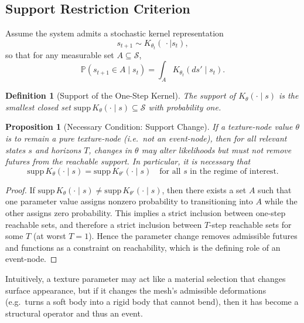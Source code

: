 \documentclass[11pt]{article}
\newtheorem{definition}{Definition}
\newtheorem{proposition}{Proposition}
\newcommand{\State}{\mathcal{S}}
\begin{document}
\subsection{Support Restriction Criterion}

Assume the system admits a stochastic kernel representation
\begin{equation}
s_{t+1} \sim K_{\theta_t}(\,\cdot \mid s_t),
\end{equation}
so that for any measurable set $A \subseteq \State$,
\begin{equation}
\mathbb{P}(s_{t+1} \in A \mid s_t) = \int_A K_{\theta_t}(ds' \mid s_t).
\end{equation}

\begin{definition}[Support of the One-Step Kernel]
The \emph{support} of $K_{\theta}(\cdot \mid s)$ is the smallest closed set
$\mathrm{supp}\,K_{\theta}(\cdot \mid s) \subseteq \State$ with
probability one.
\end{definition}

\begin{proposition}[Necessary Condition: Support Change]
If a texture-node value $\theta$ is to remain a pure texture-node (i.e.\ not an
event-node), then for all relevant states $s$ and horizons $T$,
changes in $\theta$ may alter likelihoods but must not remove futures from the
reachable support. In particular, it is necessary that
\begin{equation}
\mathrm{supp}\,K_{\theta}(\cdot \mid s) = \mathrm{supp}\,K_{\theta'}(\cdot \mid s)
\quad \text{for all } s \text{ in the regime of interest.}
\end{equation}
\end{proposition}

\begin{proof}
If $\mathrm{supp}\,K_{\theta}(\cdot \mid s) \neq \mathrm{supp}\,K_{\theta'}(\cdot \mid s)$,
then there exists a set $A$ such that one parameter value assigns nonzero
probability to transitioning into $A$ while the other assigns zero probability.
This implies a strict inclusion between one-step reachable sets, and therefore
a strict inclusion between $T$-step reachable sets for some $T$ (at worst $T=1$).
Hence the parameter change removes admissible futures and functions as a
constraint on reachability, which is the defining role of an event-node.
\end{proof}

Intuitively, a texture parameter may act like a material selection that changes
surface appearance, but if it changes the mesh's admissible deformations (e.g.\
turns a soft body into a rigid body that cannot bend), then it has become a
structural operator and thus an event.
\end{document}
